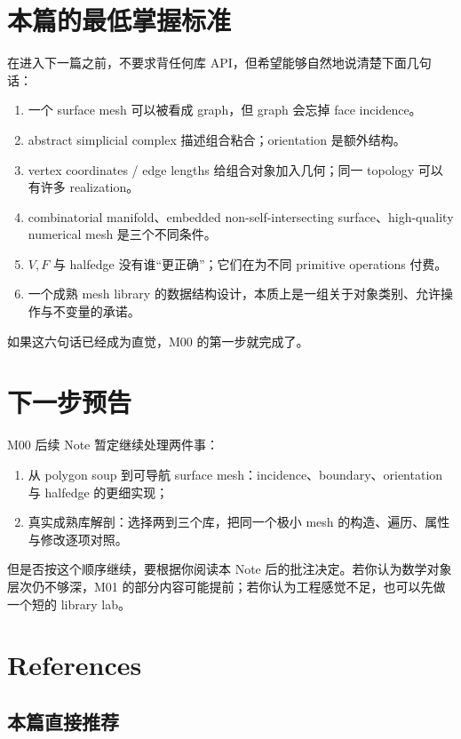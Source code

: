 \documentclass[UTF8,11pt]{ctexart}
\begin{document}
\section{本篇的最低掌握标准}

在进入下一篇之前，不要求背任何库 API，但希望能够自然地说清楚下面几句话：

\begin{enumerate}
  \item 一个 surface mesh 可以被看成 graph，但 graph 会忘掉 face incidence。
  \item abstract simplicial complex 描述组合粘合；orientation 是额外结构。
  \item vertex coordinates / edge lengths 给组合对象加入几何；同一 topology 可以有许多 realization。
  \item combinatorial manifold、embedded non-self-intersecting surface、high-quality numerical mesh 是三个不同条件。
  \item $V,F$ 与 halfedge 没有谁“更正确”；它们在为不同 primitive operations 付费。
  \item 一个成熟 mesh library 的数据结构设计，本质上是一组关于对象类别、允许操作与不变量的承诺。
\end{enumerate}

如果这六句话已经成为直觉，M00 的第一步就完成了。

\section{下一步预告}

M00 后续 Note 暂定继续处理两件事：

\begin{enumerate}
  \item 从 polygon soup 到可导航 surface mesh：incidence、boundary、orientation 与 halfedge 的更细实现；
  \item 真实成熟库解剖：选择两到三个库，把同一个极小 mesh 的构造、遍历、属性与修改逐项对照。
\end{enumerate}

但是否按这个顺序继续，要根据你阅读本 Note 后的批注决定。若你认为数学对象层次仍不够深，M01 的部分内容可能提前；若你认为工程感觉不足，也可以先做一个短的 library lab。

\section*{References}

\subsection*{本篇直接推荐}
\end{document}
